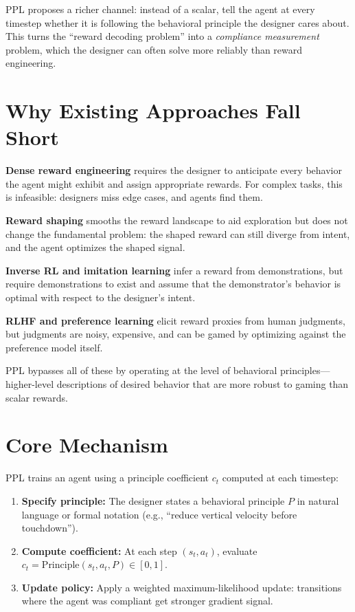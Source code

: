 \documentclass[10pt,twocolumn]{article}
\begin{document}
PPL proposes a richer channel: instead of a scalar, tell the agent at every timestep whether it is following the behavioral principle the designer cares about.
This turns the ``reward decoding problem'' into a \emph{compliance measurement} problem, which the designer can often solve more reliably than reward engineering.

\section{Why Existing Approaches Fall Short}

\textbf{Dense reward engineering} requires the designer to anticipate every behavior the agent might exhibit and assign appropriate rewards.
For complex tasks, this is infeasible: designers miss edge cases, and agents find them.

\textbf{Reward shaping} smooths the reward landscape to aid exploration but does not change the fundamental problem: the shaped reward can still diverge from intent, and the agent optimizes the shaped signal.

\textbf{Inverse RL and imitation learning} infer a reward from demonstrations, but require demonstrations to exist and assume that the demonstrator's behavior is optimal with respect to the designer's intent.

\textbf{RLHF and preference learning} elicit reward proxies from human judgments, but judgments are noisy, expensive, and can be gamed by optimizing against the preference model itself.

PPL bypasses all of these by operating at the level of behavioral principles---higher-level descriptions of desired behavior that are more robust to gaming than scalar rewards.

\section{Core Mechanism}

PPL trains an agent using a principle coefficient $c_t$ computed at each timestep:

\begin{enumerate}[leftmargin=1.5em,itemsep=2pt]
  \item \textbf{Specify principle:} The designer states a behavioral principle $P$ in natural language or formal notation (e.g., ``reduce vertical velocity before touchdown'').
  \item \textbf{Compute coefficient:} At each step $(s_t, a_t)$, evaluate $c_t = \text{Principle}(s_t, a_t, P) \in [0,1]$.
  \item \textbf{Update policy:} Apply a weighted maximum-likelihood update: transitions where the agent was compliant get stronger gradient signal.
\end{enumerate}
\end{document}
